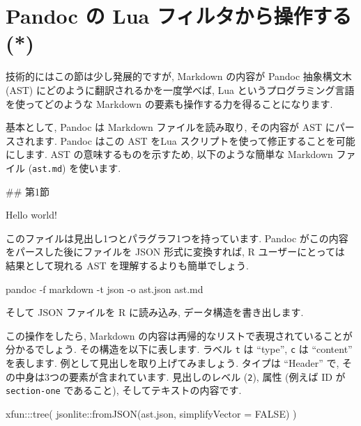 \documentclass[
  11pt,
  lualatex,ja=standard,jafont=noto]{bxjsreport}
\newenvironment{Shaded}{\begin{snugshade}}{\end{snugshade}}
\newcommand{\AttributeTok}[1]{\textcolor[rgb]{0.77,0.63,0.00}{#1}}
\newcommand{\ConstantTok}[1]{\textcolor[rgb]{0.00,0.00,0.00}{#1}}
\newcommand{\ExtensionTok}[1]{#1}
\newcommand{\FunctionTok}[1]{\textcolor[rgb]{0.00,0.00,0.00}{#1}}
\newcommand{\NormalTok}[1]{#1}
\newcommand{\SpecialCharTok}[1]{\textcolor[rgb]{0.00,0.00,0.00}{#1}}
\newcommand{\StringTok}[1]{\textcolor[rgb]{0.31,0.60,0.02}{#1}}
\begin{document}
\hypertarget{lua-filters}{%
\section{Pandoc の Lua フィルタから操作する (*)}\label{lua-filters}}


技術的にはこの節は少し発展的ですが, Markdown の内容が Pandoc 抽象構文木 (AST) にどのように翻訳されるかを一度学べば, Lua というプログラミング言語を使ってどのような Markdown の要素も操作する力を得ることになります.

基本として, Pandoc は Markdown ファイルを読み取り, その内容が AST にパースされます. Pandoc はこの AST をLua スクリプトを使って修正することを可能にします. AST の意味するものを示すため, 以下のような簡単な Markdown ファイル (\texttt{ast.md}) を使います.

\begin{Shaded}
\begin{Highlighting}[numbers=left,,]
\FunctionTok{\#\# 第1節}

\NormalTok{Hello world!}
\end{Highlighting}
\end{Shaded}

このファイルは見出し1つとパラグラフ1つを持っています. Pandoc がこの内容をパースした後にファイルを JSON 形式に変換すれば, R ユーザーにとっては 結果として現れる AST を理解するよりも簡単でしょう.

\begin{Shaded}
\begin{Highlighting}[numbers=left,,]
\ExtensionTok{pandoc} \AttributeTok{{-}f}\NormalTok{ markdown }\AttributeTok{{-}t}\NormalTok{ json }\AttributeTok{{-}o}\NormalTok{ ast.json ast.md}
\end{Highlighting}
\end{Shaded}

そして JSON ファイルを R に読み込み, データ構造を書き出します.

この操作をしたら, Markdown の内容は再帰的なリストで表現されていることが分かるでしょう. その構造を以下に表します. ラベル \texttt{t} は ``type'', \texttt{c} は ``content'' を表します. 例として見出しを取り上げてみましょう. タイプは ``Header'' で, その中身は3つの要素が含まれています. 見出しのレベル (\texttt{2}), 属性 (例えば ID が \texttt{section-one} であること), そしてテキストの内容です.

\begin{Shaded}
\begin{Highlighting}[numbers=left,,]
\NormalTok{xfun}\SpecialCharTok{:::}\FunctionTok{tree}\NormalTok{(}
\NormalTok{  jsonlite}\SpecialCharTok{::}\FunctionTok{fromJSON}\NormalTok{(}\StringTok{\textquotesingle{}ast.json\textquotesingle{}}\NormalTok{, }\AttributeTok{simplifyVector =} \ConstantTok{FALSE}\NormalTok{)}
\NormalTok{)}
\end{Highlighting}
\end{Shaded}
\end{document}
